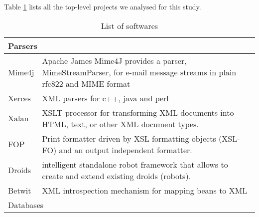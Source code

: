 
\appendices
\section{\label{sec:appendix}}

Table \ref{tab:software} lists all the top-level projects we analysed for this study.


\onecolumn
{\footnotesize
\begin{longtable}{|p{2cm} | p{14cm}|}
\caption{List of softwares\label{tab:software}}


\hline
\multicolumn{2}{|l|}{Parsers} \\
\hline

Mime4j & Apache James Mime4J provides a parser, MimeStreamParser, for e-mail message streams in plain rfc822 and MIME format
\\ Xerces & XML parsers for c++, java and perl
\\ Xalan & XSLT processor for transforming XML documents into HTML, text, or other XML document types.
\\ FOP & Print formatter driven by XSL formatting objects (XSL-FO) and an output independent formatter.
\\ Droids &  intelligent standalone robot framework that allows to create and extend existing droids (robots).
\\ Betwit &  XML introspection mechanism for mapping beans to XML \\

\hline
\multicolumn{2}{|l|}{Databases} \\
\hline


\end{longtable}}
